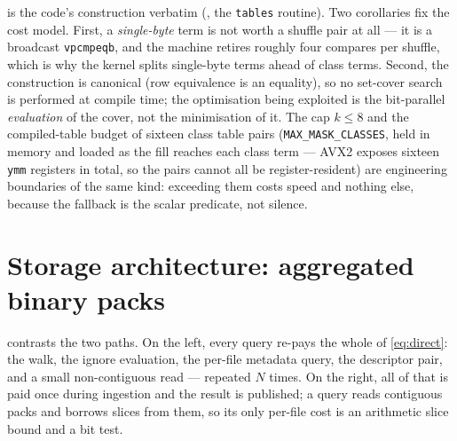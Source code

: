 \documentclass[11pt,letterpaper]{article}
\begin{document}
 is the code's construction verbatim
(, the \texttt{tables} routine). Two
corollaries fix the cost model. First, a \emph{single-byte} term is not
worth a shuffle pair at all --- it is a broadcast
\texttt{vpcmpeqb}, and the machine retires roughly four compares per
shuffle, which is why the kernel splits single-byte terms ahead of class
terms. Second, the construction is canonical (row equivalence is an
equality), so no set-cover search is performed at compile time; the
optimisation being exploited is the bit-parallel \emph{evaluation} of the
cover, not the minimisation of it. The cap $k\le 8$ and the compiled-table
budget of sixteen class table pairs (\texttt{MAX\_MASK\_CLASSES}, held in
memory and loaded as the fill reaches each class term --- AVX2 exposes
sixteen \texttt{ymm} registers in total, so the pairs cannot all be
register-resident) are engineering boundaries of the same kind: exceeding
them costs speed and nothing else,
because the fallback is the scalar predicate, not silence.

\section{Storage architecture: aggregated binary packs}
\label{sec:storage}

 contrasts the two paths. On the left, every query re-pays
the whole of \eqref{eq:direct}: the walk, the ignore evaluation, the
per-file metadata query, the descriptor pair, and a small non-contiguous
read --- repeated $N$ times. On the right, all of that is paid once during
ingestion and the result is published; a query reads contiguous packs and
borrows slices from them, so its only per-file cost is an arithmetic slice
bound and a bit test.
\end{document}
